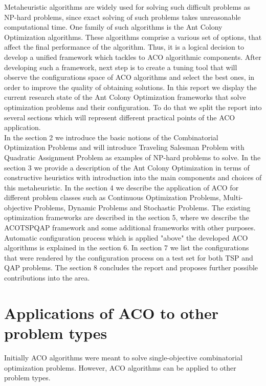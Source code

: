 \documentclass[12pt]{article}
\begin{document}
Metaheuristic algorithms are widely used for solving such difficult problems as NP-hard problems, since exact solving of such problems takes unreasonable computational time. One family of such algorithms is the Ant Colony Optimization algorithms. These algorithms comprise a various set of options, that affect the final performance of the algorithm. Thus, it is a logical decision to develop a unified framework which tackles to ACO algorithmic components. After developing such a framework, next step is to create a tuning tool that will observe the configurations space of ACO algorithms and select the best ones, in order to improve the quality of obtaining solutions.
In this report we display the current research state of the Ant Colony Optimization frameworks that solve optimization problems and their configuration. To do that we split the report into several sections which will represent different practical points of the ACO application. \\
In the section 2 we introduce the basic notions of the Combinatorial Optimization Problems and will introduce Traveling Salesman Problem with Quadratic Assignment Problem as examples of NP-hard problems to solve. In the section 3 we provide a description of the Ant Colony Optimization in terms of constructive heuristics with introduction into the main components and choices of this metaheuristic. In the section 4 we describe the application of ACO for different problem classes such as Continuous Optimization Problems, Multi-objective Problems, Dynamic Problems and Stochastic Problems.
The existing optimization frameworks are described in the section 5, where we describe the ACOTSPQAP framework and some additional frameworks with other purposes.
Automatic configuration process which is applied "above" the developed ACO algorithms is explained in the section 6.
In section 7 we list the configurations that were rendered by the configuration process on a test set for both TSP and QAP problems.
The section 8 concludes the report and proposes further possible contributions into the area.




\section{Applications of ACO to other problem types}
Initially ACO algorithms were meant to solve single-objective combinatorial optimization problems. However, ACO algorithms can be applied to other problem types.
\end{document}
